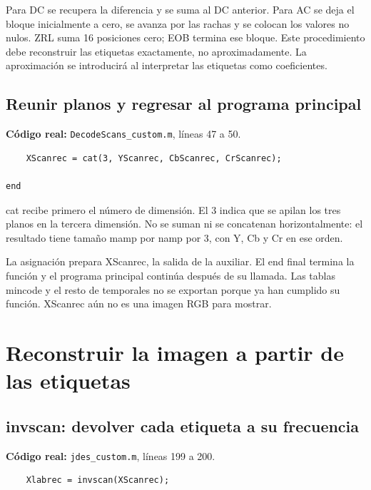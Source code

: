 \documentclass[11pt,a4paper,oneside]{report}
\begin{document}
Para DC se recupera la diferencia y se suma al DC anterior. Para AC se deja
el bloque inicialmente a cero, se avanza por las rachas y se colocan los
valores no nulos. ZRL suma 16 posiciones cero; EOB termina ese bloque. Este
procedimiento debe reconstruir las etiquetas exactamente, no aproximadamente.
La aproximación se introducirá al interpretar las etiquetas como coeficientes.


\par\medskip\noindent\begin{minipage}{\linewidth}

\subsection{Reunir planos y regresar al programa principal}

\textbf{Código real:} \texttt{DecodeScans\_custom.m}, líneas 47 a 50.

\begin{lstlisting}[firstnumber=47]
    % Reunir las tres componentes.
    XScanrec = cat(3, YScanrec, CbScanrec, CrScanrec);

end
\end{lstlisting}

\end{minipage}\par


cat recibe primero el número de dimensión. El 3 indica que se apilan los
tres planos en la tercera dimensión. No se suman ni se concatenan horizontalmente:
el resultado tiene tamaño mamp por namp por 3, con Y, Cb y Cr en ese orden.

La asignación prepara XScanrec, la salida de la auxiliar. El end final
termina la función y el programa principal continúa después de su llamada.
Las tablas mincode y el resto de temporales no se exportan porque ya han
cumplido su función. XScanrec aún no es una imagen RGB para mostrar.


\section{Reconstruir la imagen a partir de las etiquetas}

\par\medskip\noindent\begin{minipage}{\linewidth}

\subsection{invscan: devolver cada etiqueta a su frecuencia}

\textbf{Código real:} \texttt{jdes\_custom.m}, líneas 199 a 200.

\begin{lstlisting}[firstnumber=199]
    % PASO 9: deshacer el orden zigzag.
    Xlabrec = invscan(XScanrec);
\end{lstlisting}

\end{minipage}\par
\end{document}
